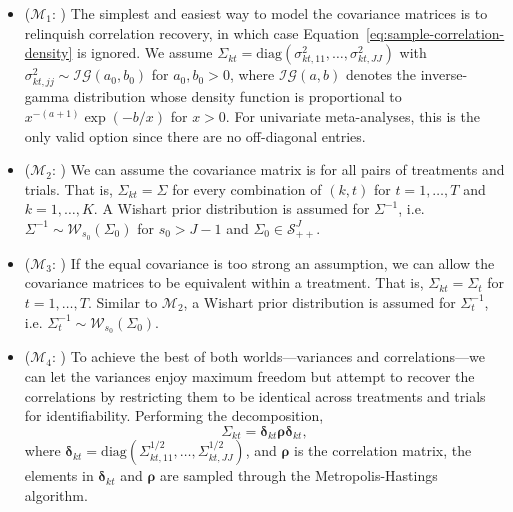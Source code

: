\begin{itemize}
  \item ($\mathcal{M}_1$: ) The simplest and easiest way to model the covariance matrices is to relinquish correlation recovery, in which case Equation~\eqref{eq:sample-correlation-density} is ignored. We assume $\Sigma_{kt} = \mathrm{diag}(\sigma_{kt,11}^2,\ldots, \sigma_{kt,JJ}^2)$ with $\sigma_{kt,jj}^2 \sim \mathcal{IG}(a_0,b_0)$ for $a_0,b_0>0$, where $\mathcal{IG}(a,b)$ denotes the
inverse-gamma distribution whose density function is proportional to $x^{-(a+1)} \exp(-b/x)$ for $x>0$. For univariate meta-analyses, this is the only valid option since there are no off-diagonal entries.

\item ($\mathcal{M}_2$: ) We can assume the covariance matrix is for all pairs of treatments and trials. That is, $\Sigma_{kt} = \Sigma$ for every combination of $(k,t)$ for $t=1,\ldots,T$ and
$k=1,\ldots,K$. A Wishart prior distribution is assumed for $\Sigma^{-1}$, i.e. $\Sigma^{-1} \sim \mathcal{W}_{s_0}(\Sigma_0)$ for $s_0>J-1$ and $\Sigma_0\in \mathcal{S}_{++}^J$.


\item ($\mathcal{M}_3$: ) If the equal covariance is too strong an assumption, we can allow the covariance matrices to be equivalent within a treatment. That is,
$\Sigma_{kt} = \Sigma_t$ for $t=1,\ldots,T$. Similar to $\mathcal{M}_2$, a Wishart prior distribution is assumed for $\Sigma_t^{-1}$, i.e. $\Sigma_t^{-1} \sim \mathcal{W}_{s_0}(\Sigma_0)$.


\item ($\mathcal{M}_4$: ) To achieve the best of both worlds---variances and correlations---we can let the variances enjoy maximum freedom but attempt to recover the correlations by restricting them to be identical across treatments and trials for identifiability. Performing the decomposition,
$$
\Sigma_{kt} = \bm{\delta}_{kt}\bm{\rho} \bm{\delta}_{kt},
$$
where $\bm{\delta}_{kt} = \mathrm{diag}(\Sigma_{kt,11}^{1/2},\ldots,\Sigma_{kt,JJ}^{1/2})$, and $\bm{\rho}$ is the correlation matrix, the elements in $\bm{\delta}_{kt}$ and $\bm{\rho}$ are sampled through the Metropolis-Hastings algorithm.



\end{itemize}

